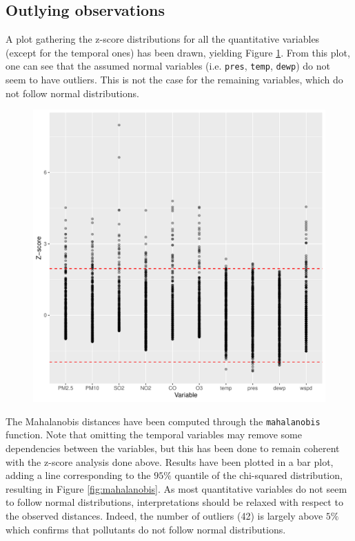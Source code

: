 \documentclass[a4paper, 12pt]{article}
\begin{document}
	\subsection{Outlying observations}
    A plot gathering the z-score distributions for all the quantitative variables (except for the temporal ones) has been drawn, yielding Figure \ref{fig:z_scores_outlying}. From this plot, one can see that the assumed normal variables (i.e. \texttt{pres}, \texttt{temp}, \texttt{dewp}) do not seem to have outliers. This is not the case for the remaining variables, which do not follow normal distributions. \par
    \begin{figure}[h]
        \centering
        \includegraphics[height =     0.45\textwidth]{resources/pdf/z_scores.pdf}
        \label{fig:z_scores_outlying}
    \end{figure}
    The Mahalanobis distances have been computed through the \texttt{mahalanobis} function. Note that omitting the temporal variables may remove some dependencies between the variables, but this has been done to remain coherent with the z-score analysis done above. Results have been plotted in a bar plot, adding a line corresponding to the $95\%$ quantile of the chi-squared distribution, resulting in Figure \ref{fig:mahalanobis}. As most quantitative variables do not seem to follow normal distributions, interpretations should be relaxed with respect to the observed distances. Indeed, the number of outliers (\num{42}) is largely above $5 \%$ which confirms that pollutants do not follow normal distributions. \par
\end{document}
